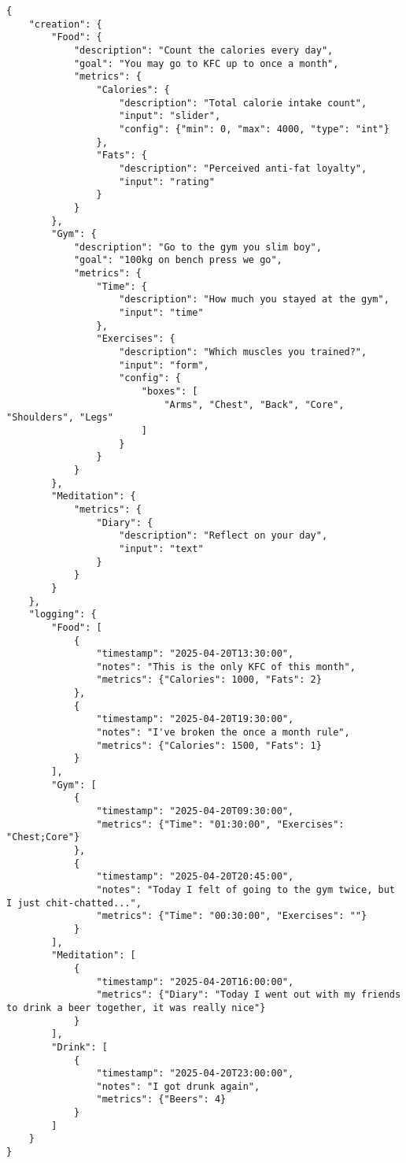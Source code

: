 \documentclass{article}
\begin{document}
\begin{verbatim}
{
    "creation": {
        "Food": {
            "description": "Count the calories every day",
            "goal": "You may go to KFC up to once a month",
            "metrics": {
                "Calories": {
                    "description": "Total calorie intake count",
                    "input": "slider",
                    "config": {"min": 0, "max": 4000, "type": "int"}
                },
                "Fats": {
                    "description": "Perceived anti-fat loyalty",
                    "input": "rating"
                }
            }
        },
        "Gym": {
            "description": "Go to the gym you slim boy",
            "goal": "100kg on bench press we go",
            "metrics": {
                "Time": {
                    "description": "How much you stayed at the gym",
                    "input": "time"
                },
                "Exercises": {
                    "description": "Which muscles you trained?",
                    "input": "form",
                    "config": {
                        "boxes": [
                            "Arms", "Chest", "Back", "Core", "Shoulders", "Legs"
                        ]
                    }
                }
            }
        },
        "Meditation": {
            "metrics": {
                "Diary": {
                    "description": "Reflect on your day",
                    "input": "text"
                }
            }
        }
    },
    "logging": {
        "Food": [
            {
                "timestamp": "2025-04-20T13:30:00",
                "notes": "This is the only KFC of this month",
                "metrics": {"Calories": 1000, "Fats": 2}
            },
            {
                "timestamp": "2025-04-20T19:30:00",
                "notes": "I've broken the once a month rule",
                "metrics": {"Calories": 1500, "Fats": 1}
            }
        ],
        "Gym": [
            {
                "timestamp": "2025-04-20T09:30:00",
                "metrics": {"Time": "01:30:00", "Exercises": "Chest;Core"}
            },
            {
                "timestamp": "2025-04-20T20:45:00",
                "notes": "Today I felt of going to the gym twice, but I just chit-chatted...",
                "metrics": {"Time": "00:30:00", "Exercises": ""}
            }
        ],
        "Meditation": [
            {
                "timestamp": "2025-04-20T16:00:00",
                "metrics": {"Diary": "Today I went out with my friends to drink a beer together, it was really nice"}
            }
        ],
        "Drink": [
            {
                "timestamp": "2025-04-20T23:00:00",
                "notes": "I got drunk again",
                "metrics": {"Beers": 4}
            }
        ]
    }
}
\end{verbatim}
\end{document}
